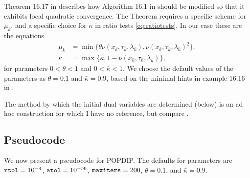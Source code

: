 \documentclass[11pt]{article}
\begin{document}
Theorem 16.17 in \cite{GrivaNashSofer2009} describes how Algorithm 16.1 in \cite{GrivaNashSofer2009} should be modified so that it exhibits local quadratic convergence.  The Theorem requires a specific scheme for $\mu_k$, and a specific choice for $\kappa$ in ratio tests \eqref{eq:ratiotests}.  In our case these are the equations
\begin{align}
\mu_k &= \min\{\theta \nu(x_k,\tau_k,\lambda_k),\nu(x_k,\tau_k,\lambda_k)^2\}, \label{eq:muupdate} \\
\kappa &= \max\{\bar\kappa,1-\nu(x_k,\tau_k,\lambda_k)\}, \label{eq:kappaformula}
\end{align}
for parameters $0<\theta<1$ and $0<\bar\kappa<1$.  We choose the default values of the parameters as $\theta=0.1$ and $\bar\kappa=0.9$, based on the minimal hints in example 16.16 in \cite{GrivaNashSofer2009}.

The method by which the initial dual variables are determined (below) is an ad hoc construction for which I have no reference, but compare \cite{Gertzetal2004}.


\subsection*{Pseudocode}

We now present a pseudocode for POPDIP.  The defaults for parameters are $\text{\texttt{rtol}}=10^{-4}$, $\text{\texttt{atol}}=10^{-50}$, $\text{\texttt{maxiters}}=200$, $\theta=0.1$, and $\bar\kappa=0.9$.
\end{document}
